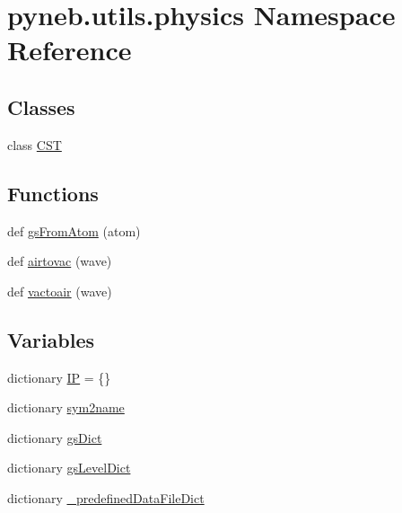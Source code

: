 \hypertarget{namespacepyneb_1_1utils_1_1physics}{}\section{pyneb.\+utils.\+physics Namespace Reference}
\label{namespacepyneb_1_1utils_1_1physics}
\subsection*{Classes}
\begin{DoxyCompactItemize}
\item 
class \hyperlink{classpyneb_1_1utils_1_1physics_1_1_c_s_t}{C\+S\+T}
\end{DoxyCompactItemize}
\subsection*{Functions}
\begin{DoxyCompactItemize}
\item 
def \hyperlink{namespacepyneb_1_1utils_1_1physics_affea300d5f6d64b440b7363755a67cef}{gs\+From\+Atom} (atom)
\item 
def \hyperlink{namespacepyneb_1_1utils_1_1physics_a75304d89e533b2199decec697f90c9a4}{airtovac} (wave)
\item 
def \hyperlink{namespacepyneb_1_1utils_1_1physics_aafb02f69e32ab62fa89420481f9a65f4}{vactoair} (wave)
\end{DoxyCompactItemize}
\subsection*{Variables}
\begin{DoxyCompactItemize}
\item 
dictionary \hyperlink{namespacepyneb_1_1utils_1_1physics_a041738a1b0abdb597dd654aec4d96757}{I\+P} = \{\}
\item 
dictionary \hyperlink{namespacepyneb_1_1utils_1_1physics_aaad8df22981701858aa5539c86a96b5b}{sym2name}
\item 
dictionary \hyperlink{namespacepyneb_1_1utils_1_1physics_a1960e51460ec0d63ffe40b02e0280186}{gs\+Dict}
\item 
dictionary \hyperlink{namespacepyneb_1_1utils_1_1physics_a18b749f74e825f8a60744ecba2078ce2}{gs\+Level\+Dict}
\item 
dictionary \hyperlink{namespacepyneb_1_1utils_1_1physics_a07a026669fde4152bdb02f243cc4f4d4}{\+\_\+predefined\+Data\+File\+Dict}
\end{DoxyCompactItemize}


